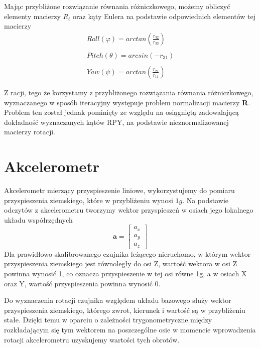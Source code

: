 Mając przybliżone rozwiązanie równania różniczkowego, możemy obliczyć elementy macierzy $R_t$ oraz kąty Eulera na podstawie odpowiednich elementów tej macierzy
\begin{equation}
    \begin{array}{c}
        Roll(\varphi) = arctan(\frac{r_{32}}{r_{33}}) \\ \\
        Pitch(\theta) = arcsin(-r_{31}) \\ \\
        Yaw(\psi) = arctan(\frac{r_{21}}{r_{11}})
    \end{array}
\end{equation}

Z racji, tego że korzystamy z przybliżonego rozwiązania równania różniczkowego, wyznaczanego w sposób iteracyjny występuje problem normalizacji macierzy \textbf{R}. Problem ten został jednak pominięty ze względu na osiągniętą zadowalającą dokładność wyznaczanych kątów RPY, na podstawie nieznormalizowanej macierzy rotacji.

\section{Akcelerometr}

Akcelerometr mierzący przyspieszenie liniowe, wykorzystujemy do pomiaru przyspieszenia ziemskiego, które w przybliżeniu wynosi $1g$. Na podstawie odczytów z akcelerometru tworzymy wektor przyspieszeń w osiach jego lokalnego układu współrzędnych
$$
    \mathbf{a} = 
    \left[
    \begin{array}{cc}
        a_x \\
        a_y \\
        a_z
    \end{array}
    \right]
$$
Dla prawidłowo skalibrowanego czujnika leżącego nieruchomo, w którym wektor przyspieszenia ziemskiego jest równoległy do osi Z, wartość wektora w osi Z powinna wynosić 1, co oznacza przyspieszenie w tej osi równe 1g, a w osiach X oraz Y, wartość przyspieszenia powinna wynosić 0.

Do wyznaczenia rotacji czujnika względem układu bazowego służy wektor przyspieszenia ziemskiego, którego zwrot, kierunek i wartość są w przybliżeniu stałe. Dzięki temu w oparciu o zależności trygonometryczne między rozkładającym się tym wektorem na poszczególne osie w momencie wprowadzenia rotacji akcelerometru uzyskujemy wartości tych obrotów.

